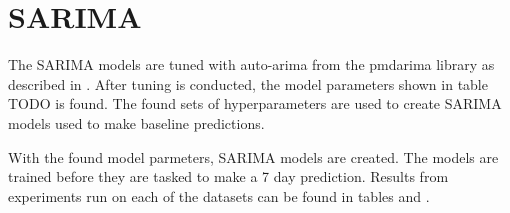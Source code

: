 \section{SARIMA}
\label{section:Results:SARIMA}

The SARIMA models are tuned with auto-arima from the pmdarima library as described in .
After tuning is conducted, the model parameters shown in table TODO is found.
The found sets of hyperparameters are used to create SARIMA models used to make baseline predictions.


With the found model parmeters, SARIMA models are created.
The models are trained before they are tasked to make a 7 day prediction.
Results from experiments run on each of the datasets can be found in tables
 and .

